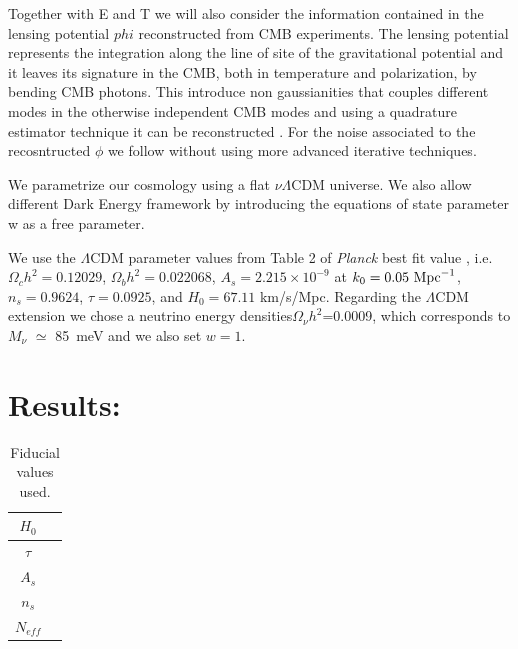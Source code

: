 \documentclass[aps,prl,preprint,groupedaddress]{revtex4-1}
\begin{document}
Together with E and T we will also consider the information contained in the  
lensing potential $phi$ reconstructed from CMB experiments. The lensing potential represents the integration along the line of site of the gravitational potential and it leaves its signature in the CMB, both in temperature and polarization, by bending CMB photons. This introduce non gaussianities that couples different modes in the otherwise independent CMB modes and using a quadrature estimator technique it can be reconstructed \cite{okamoto:2003,hu:2002}.
For the noise associated to the recosntructed $\phi$ we follow \cite{okamoto:2003,hu:2002} without using more advanced iterative techniques.

We parametrize our cosmology using a flat $\nu \Lambda$CDM universe. We also allow different Dark Energy framework by introducing the equations of state parameter w as a free parameter.

We use the $\Lambda$CDM parameter values from Table 2 of \textit{Planck} best fit value \cite{planck-collaboration:2014g}, i.e. $\Omega_c h^2 =  0.12029$,  $\Omega_b h^2  = 0.022068$, $A_s = 2.215\times10^{-9}$ at $k_0 = 0.05\ {\rm Mpc}^{-1}$, $n_s = 0.9624$, $\tau = 0.0925$, and $H_0 = 67.11$ km/s/Mpc. Regarding the $\Lambda$CDM extension we chose a neutrino energy densities$\Omega_{\nu} h^2$=0.0009, which corresponds to $M_{\nu}$  $\simeq$ 85\ meV and we also set $w=1$.


%




\section{Results: \label{sec:results}}

\begin{table}[htdp]
\caption{Fiducial values used.}
\begin{center}
\begin{tabular}{|c|c|}
\hline
$H_{0}$ &\\
\hline
\hline
$\tau$ &  \\
\hline

\hline
$A_{s}$ & \\
\hline

\hline
$n_{s}$ & \\
\hline

\hline
$N_{eff}$ & \\
\hline
\end{tabular}
\end{center}
\label{default}
\end{table}%
\end{document}
